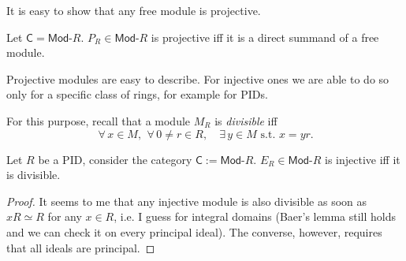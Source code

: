 \begin{rem}
	It is easy to show that any free module is projective.
\end{rem}

\begin{prop}
	Let $\mathsf{C} = \mathsf{Mod}\text{-}R$.
	$P_R \in \mathsf{Mod}\text{-}R$ is projective iff 
	it is a direct summand of a free module.
\end{prop} 

\begin{rem}
	Projective modules are easy to describe.
	For injective ones we are able to do so only for a specific class of rings, for example for PIDs.

	For this purpose, recall that a module $M_R$ is {\em divisible} iff
	\begin{equation}
	\,\forall\, x \in M, \ \,\forall\, 0 \neq r \in R, \quad \exists\, y \in M \text{ s.t. } x = yr
	.\end{equation} 
\end{rem}

\begin{prop}
	Let $R$ be a PID, consider the category $\mathsf{C} := \mathsf{Mod}\text{-}R$.
	$E_R \in \mathsf{Mod}\text{-}R$ is injective iff it is divisible.
\end{prop} 
\begin{proof}
	It seems to me that any injective module is also divisible
	as soon as $xR \simeq R$ for any $x \in R$, i.e. I guess for integral domains
	(Baer's lemma still holds and we can check it on every principal ideal).
	The converse, however, requires that all ideals are principal.
\end{proof}

